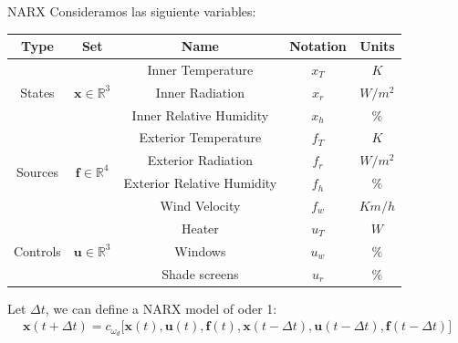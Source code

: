     
    \begin{model}{NARX}{}
    Consideramos las siguiente variables:
    \begin{center}
        \begin{tabular}{|c|c|c|c|c|}
            \hline
            \textbf{Type} & \textbf{Set} &\textbf{Name} & \textbf{Notation} & \textbf{Units} \\
                \hline
                \multirow{3}{*}{States} & 
                \multirow{3}{*}{$\bm{x} \in \mathbb{R}^3$}&
                    Inner Temperature & $x_{T}$ & $K$ \\
                & & Inner Radiation & $x_{r}$ & $W/m^2$ \\
                & & Inner Relative Humidity & $x_{h}$ & $\%$\\
                \hline
                \hline
                \multirow{4}{*}{Sources } &
                \multirow{4}{*}{$\bm{f} \in \mathbb{R}^4$} &
                    Exterior Temperature & $f_{T}$ & $K$ \\
                & & Exterior Radiation & $f_{r}$ & $W/m^2$ \\
                & & Exterior Relative Humidity & $f_{h}$ & $\%$\\
                & & Wind Velocity & $f_w$ & $Km/h$  \\
                \hline
                \hline
                \multirow{3}{*}{Controls} &
                \multirow{3}{*}{$\bm{u} \in \mathbb{R}^3$} &
                    Heater         & $u_{T}$ & $W$ \\
                & & Windows        & $u_{w}$ & $\%$ \\
                & & Shade screens  & $u_{r}$ & $\%$\\
                    \hline
        \end{tabular}  
    \end{center}
    
    Let $\Delta t$, we can define a NARX model of oder 1:
    \begin{gather}
        \bm{x}(t+\Delta t) = c_{\omega_d} \Big[ \bm{x}(t),\bm{u}(t),\bm{f}(t),\bm{x}(t-\Delta t),\bm{u}(t-\Delta t),\bm{f}(t-\Delta t)  \Big]
    \end{gather}
    
    \end{model}
    
    
    
